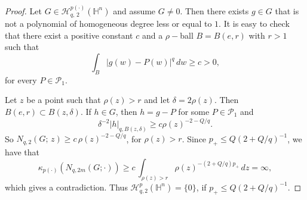 \documentclass[10pt,a4paper]{amsart}
\begin{document}
\begin{proof} Let $G \in \mathcal{H}^{p(\cdot)}_{q, \, 2}(\mathbb{H}^{n})$ and assume $G \neq 0$. Then there exists 
$g \in G$ that is not a polynomial of homogeneous degree less or equal to $1$. It is easy to check that there exist a positive constant $c$ and a $\rho-$ball $B = B(e,r)$ with $r>1$ such that
\[
\int_{B} |g(w) - P(w)|^{q} \, dw \geq c > 0,
\]
for every $P \in \mathcal{P}_{1}$.

Let $z$ be a point such that $\rho(z) > r$ and let $\delta = 2 \rho(z)$. Then $B(e, r) \subset B(z, \delta)$. If $h \in G$, then 
$h = g - P$ for some $P \in \mathcal{P}_{1}$ and
\[
\delta^{-2}|h|_{q, B(z, \delta)} \geq c \rho(z)^{-2-Q/q}.
\]
So $N_{q,2}(G; \, z) \geq c \, \rho(z)^{-2-Q/q}$, for $\rho(z) > r$. Since $p_{+} \leq Q(2+Q/q)^{-1}$, we have that
\[
\kappa_{p(\cdot)} \left( N_{q,2m}(G; \cdot) \right) \geq c \, \int_{\rho(z) > r} \rho(z)^{-(2+Q/q)p_{+}} \, dz = \infty,
\]
which gives a contradiction. Thus $\mathcal{H}^{p}_{q, 2}(\mathbb{H}^{n}) = \{0\}$, if $p_{+} \leq Q(2+Q/q)^{-1}$.
\end{proof}
\end{document}
